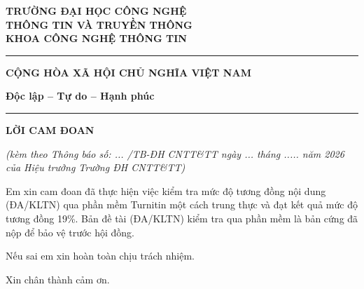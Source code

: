 
\thispagestyle{empty}

\vspace*{-0.4cm}

\noindent
\begin{minipage}[t]{0.45\textwidth}
	\centering
	{\fontsize{12}{13.5}\selectfont\bfseries
		TRƯỜNG ĐẠI HỌC CÔNG NGHỆ\\
		THÔNG TIN VÀ TRUYỀN THÔNG\\
		KHOA CÔNG NGHỆ THÔNG TIN}
	
	\vspace{0.15cm}
	\rule{4.8cm}{0.4pt}
\end{minipage}
\hfill
\begin{minipage}[t]{0.60\textwidth}
	\centering
	{\fontsize{12}{14}\selectfont\bfseries
		CỘNG HÒA XÃ HỘI CHỦ NGHĨA VIỆT NAM}
	
	\vspace{0.05cm}
	
	{\fontsize{12}{14}\selectfont\bfseries
		Độc lập -- Tự do -- Hạnh phúc}
	
	\vspace{0.15cm}
	\rule{7.2cm}{0.4pt}
\end{minipage}

\vspace{1.6cm}

\begin{center}
	{\fontsize{17}{20}\selectfont\bfseries LỜI CAM ĐOAN}
	
	\vspace{0.25cm}
	
	{\fontsize{13}{16}\selectfont\itshape
		(kèm theo Thông báo số: ... /TB-ĐH CNTT\&TT ngày ... tháng ..... năm 2026}\\
	{\fontsize{13}{16}\selectfont\itshape
		của Hiệu trưởng Trường ĐH CNTT\&TT)}
\end{center}

\vspace{1.35cm}

{\fontsize{13}{22}\selectfont
	\setlength{\parindent}{1cm}
	\setlength{\parskip}{0pt}
	
	Em xin cam đoan đã thực hiện việc kiểm tra mức độ tương đồng nội dung
	(ĐA/KLTN) qua phần mềm Turnitin một cách trung thực và đạt kết quả mức
	độ tương đồng 19\%. Bản đề tài (ĐA/KLTN) kiểm tra qua phần mềm là bản
	cứng đã nộp để bảo vệ trước hội đồng.
	
	Nếu sai em xin hoàn toàn chịu trách nhiệm.
	
	Xin chân thành cảm ơn.
}

